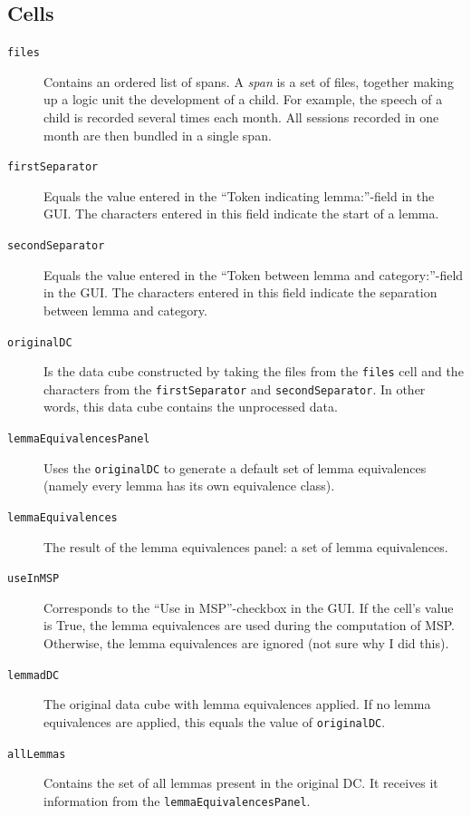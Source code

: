\documentclass{article}
\begin{document}
\subsection{Cells}
\begin{description}
\item[\texttt{files}] Contains an ordered list of spans. A \emph{span} is a set of files, together making up a logic unit the development of a child. For example, the speech of a child is recorded several times each month. All sessions recorded in one month are then bundled in a single span. 

\item[\texttt{firstSeparator}] Equals the value entered in the ``Token indicating lemma:''-field in the GUI. The characters entered in this field indicate the start of a lemma.

\item[\texttt{secondSeparator}] Equals the value entered in the ``Token between lemma and category:''-field in the GUI. The characters entered in this field indicate the separation between lemma and category. 

\item[\texttt{originalDC}] Is the data cube constructed by taking the files from the \texttt{files} cell and the characters from the \texttt{firstSeparator} and \texttt{secondSeparator}. In other words, this data cube contains the unprocessed data.

\item[\texttt{lemmaEquivalencesPanel}] Uses the \texttt{originalDC} to generate a default set of lemma equivalences (namely every lemma has its own equivalence class). 

\item[\texttt{lemmaEquivalences}] The result of the lemma equivalences panel: a set of lemma equivalences. 

\item[\texttt{useInMSP}] Corresponds to the ``Use in MSP''-checkbox in the GUI. If the cell's value is True, the lemma equivalences are used during the computation of MSP. Otherwise, the lemma equivalences are ignored (not sure why I did this).

\item[\texttt{lemmadDC}] The original data cube with lemma equivalences applied. If no lemma equivalences are applied, this equals the value of \texttt{originalDC}.

\item[\texttt{allLemmas}] Contains the set of all lemmas present in the original DC. It receives it information from the \texttt{lemmaEquivalencesPanel}. 


\end{description}
\end{document}
